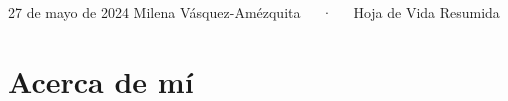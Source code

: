 \documentclass[11pt,a4paper,]{awesome-cv}
\begin{document}
\makecvheader

\makecvfooter
  {27 de mayo de 2024}
    {Milena Vásquez-Amézquita~~~·~~~Hoja de Vida Resumida}
  {\thepage}





\section{Acerca de mí}\label{acerca-de-muxed}
\end{document}
